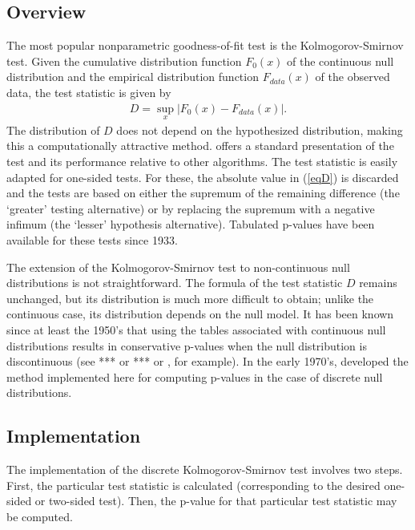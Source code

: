 
\subsection{Overview}

The most popular nonparametric goodness-of-fit test is the
Kolmogorov-Smirnov test.
Given the cumulative distribution
function $F_0(x)$ of the continuous null distribution
and the empirical distribution function $F_{data}(x)$ of the observed data,  the test statistic is given by
\begin{align}
D = \sup_x \left| F_0(x)- F_{data}(x) \right|.    \label{eqD}
\end{align}
The distribution of $D$ does not depend on the hypothesized
distribution, making this a computationally
attractive method. \cite{slakter65} offers a standard presentation
of the test and its
performance relative to other algorithms. 
The test statistic is easily adapted for one-sided tests.
For these, the absolute value in (\ref{eqD}) is discarded and the tests are based
on either the supremum of the remaining difference (the `greater' testing
alternative) or by replacing the supremum with a negative infimum
(the `lesser' hypothesis alternative).  Tabulated p-values have been
available for these tests since 1933. %


The extension of the Kolmogorov-Smirnov test to non-continuous 
null distributions is not straightforward. The formula of
the test statistic $D$ remains unchanged, but its distribution
is much more difficult to obtain; unlike the 
continuous case, its distribution depends on the null model.
It has been known since at least the 1950's that using the tables associated
with continuous null distributions results in conservative p-values
when the null distribution is discontinuous 
(see *** or *** or \citet{stephens1974}, for example).  In the early 1970's, 
\citet{Conover1972} developed the method implemented here
for computing p-values
in the case of discrete null distributions.

\subsection{Implementation}

The implementation of the discrete Kolmogorov-Smirnov test involves
two steps. First, the particular test statistic is calculated
(corresponding to the desired one-sided or two-sided test).
Then, the p-value for that particular test statistic may be computed. 

